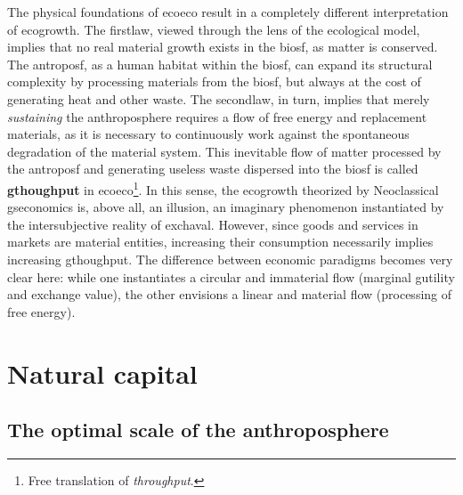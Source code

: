 \documentclass[./main_en.tex]{subfiles}
\begin{document}
\par The physical foundations of \gls{ecoeco} result in a completely different interpretation of \gls{ecogrowth}. The \gls{firstlaw}, viewed through the lens of the ecological \gls{model}, implies that no real material growth exists in the \gls{biosf}, as matter is conserved. The \gls{antroposf}, as a human habitat within the \gls{biosf}, can expand its structural complexity by processing materials from the \gls{biosf}, but always at the cost of generating heat and other waste. The \gls{secondlaw}, in turn, implies that merely \textit{sustaining} the anthroposphere requires a flow of free energy and replacement materials, as it is necessary to continuously work against the spontaneous degradation of the material \gls{system}. This inevitable flow of matter processed by the \gls{antroposf} and generating useless waste dispersed into the \gls{biosf} is called \textbf{\gls{gthoughput}} in \gls{ecoeco}\footnote{Free translation of \textit{throughput}.}. In this sense, the \gls{ecogrowth} theorized by Neoclassical \gls{gseconomics} is, above all, an illusion, an imaginary phenomenon instantiated by the intersubjective reality of \gls{exchaval}. However, since goods and services in markets are material entities, increasing their consumption necessarily implies increasing \gls{gthoughput}. The difference between economic paradigms becomes very clear here: while one instantiates a circular and immaterial flow (marginal \gls{gutility} and exchange value), the other envisions a linear and material flow (processing of free energy).

\section{Natural capital} \label{chap:ecoeco:natcap}

\subsection{The optimal scale of the anthroposphere} \label{subsec:escaleopt}
\end{document}

